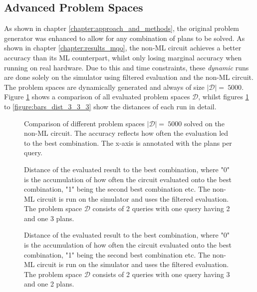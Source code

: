 \newpage

\subsection{Advanced Problem Spaces}
\label{chapter:results_advanced_problem_spaces}
As shown in chapter \ref{chapter:approach_and_methods}, the original problem generator was enhanced to allow for any combination of plans to be solved. As shown in chapter \ref{chapter:results_mqo}, the non-ML circuit achieves a better accuracy than its ML counterpart, whilst only losing marginal accuracy when running on real hardware. Due to this and time constraints, these \emph{dynamic} runs are done solely on the simulator using filtered evaluation and the non-ML circuit. The problem spaces are dynamically generated and always of size $\left|\mathcal{D}\right| =\ 5000$. Figure \ref{figure:overview_dynamic_problems} shows a comparison of all evaluated problem spaces $\mathcal{D}$, whilst figures \ref{figure:overview_dynamic_problems} to \ref{figure:bars_dist_3_3_3} show the distances of each run in detail.


\begin{figure}[!h]
    \centering
    \scalebox{\resultboxplot}{
        
    }
    \caption{Comparison of different problem spaces $\left|\mathcal{D}\right| =\ 5000$ solved on the non-ML circuit. The accuracy reflects how often the evaluation led to the best combination. The x-axis is annotated with the plans per query.}
    \label{figure:overview_dynamic_problems}
\end{figure}

\begin{figure}[!h]
    \centering
    \scalebox{\resultboxplot}{
        
    }
    \caption{Distance of the evaluated result to the best combination, where "0" is the accumulation of how often the circuit evaluated onto the best combination, "1" being the second best combination etc. The non-ML circuit is run on the simulator and uses the filtered evaluation. The problem space $\mathcal{D}$ consists of 2 queries with one query having 2 and one 3 plans.}
    \label{figure:bars_dist_2_3}
\end{figure}

\begin{figure}[!h]
    \centering
    \scalebox{\resultboxplot}{
        
    }
    \caption{Distance of the evaluated result to the best combination, where "0" is the accumulation of how often the circuit evaluated onto the best combination, "1" being the second best combination etc. The non-ML circuit is run on the simulator and uses the filtered evaluation. The problem space $\mathcal{D}$ consists of 2 queries with one query having 3 and one 2 plans.}
    \label{figure:bars_dist_3_2}
\end{figure}

